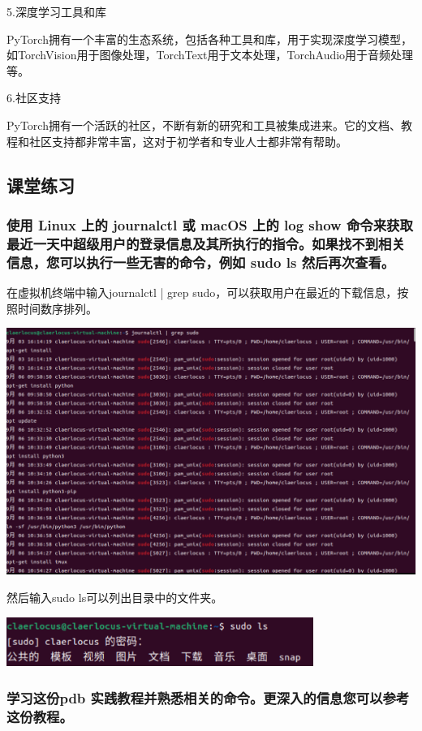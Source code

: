 \documentclass[UTF8,a4paper]{ctexart}
\begin{document}
\begin{sloppypar}
	5.深度学习工具和库
	
	PyTorch拥有一个丰富的生态系统，包括各种工具和库，用于实现深度学习模型，如TorchVision用于图像处理，TorchText用于文本处理，TorchAudio用于音频处理等。
	
	6.社区支持
	
	PyTorch拥有一个活跃的社区，不断有新的研究和工具被集成进来。它的文档、教程和社区支持都非常丰富，这对于初学者和专业人士都非常有帮助。
	
	\subsection{课堂练习}
	\graphicspath{{figure/}}
	\subsubsection{使用 Linux 上的 journalctl 或 macOS 上的 log show 命令来获取最近一天中超级用户的登录信息及其所执行的指令。如果找不到相关信息，您可以执行一些无害的命令，例如 sudo ls 然后再次查看。}

	\bigskip
	\bigskip
	
	在虚拟机终端中输入journalctl | grep sudo，可以获取用户在最近的下载信息，按照时间数序排列。
	
	\includegraphics[width = 16cm]{1}
	
	然后输入sudo ls可以列出目录中的文件夹。
	
	\includegraphics[width = 10cm]{2}
	
	\subsubsection{学习这份pdb 实践教程并熟悉相关的命令。更深入的信息您可以参考这份教程。}
	

\end{sloppypar}
\end{document}
